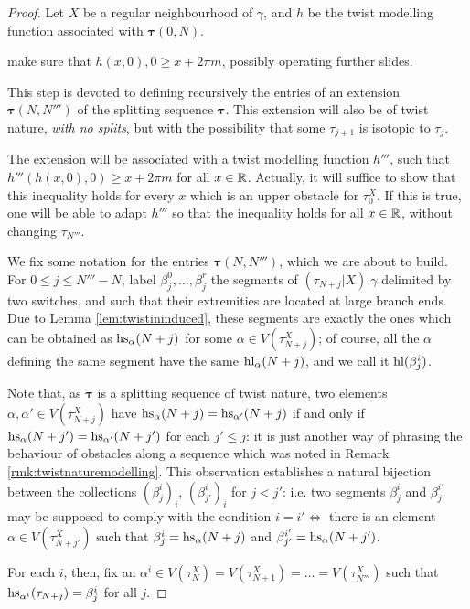 \begin{proof}
Let $X$ be a regular neighbourhood of $\gamma$, and $h$ be the twist modelling function associated with $\bm\tau(0,N)$.

 make sure that $h(x,0),0\geq x+2\pi m$, possibly operating further slides.

This step is devoted to defining recursively the entries of an extension $\bm\tau(N,N''')$ of the splitting sequence $\bm\tau$. This extension will also be of twist nature, \emph{with no splits}, but with the possibility that some $\tau_{j+1}$ is isotopic to $\tau_j$.

The extension will be associated with a twist modelling function $h'''$, such that $h'''(h(x,0),0)\geq x+2\pi m$ for all $x\in\mathbb R$. Actually, it will suffice to show that this inequality holds for every $x$ which is an upper obstacle for $\tau_0^X$. If this is true, one will be able to adapt $h'''$ so that the inequality holds for all $x\in\mathbb R$, without changing $\tau_{N'''}$.

We fix some notation for the entries $\bm\tau(N,N''')$, which we are about to build. For $0\leq j \leq N'''-N$, label $\beta_j^0,\ldots,\beta_j^r$ the segments of $(\tau_{N+j}|X).\gamma$ delimited by two switches, and such that their extremities are located at large branch ends. Due to Lemma \ref{lem:twistininduced}, these segments are exactly the ones which can be obtained as $\mathrm{hs}_\alpha(N+j)$ for some $\alpha\in V(\tau_{N+j}^X)$; of course, all the $\alpha$ defining the same segment have the same $\mathrm{hl}_\alpha(N+j)$, and we call it $\mathrm{hl}(\beta_j^i)$.

Note that, as $\bm\tau$ is a splitting sequence of twist nature, two elements $\alpha,\alpha'\in V(\tau_{N+j}^X)$ have $\mathrm{hs}_\alpha(N+j)=\mathrm{hs}_{\alpha'}(N+j)$ if and only if $\mathrm{hs}_\alpha(N+j')=\mathrm{hs}_{\alpha'}(N+j')$ for each $j'\leq j$: it is just another way of phrasing the behaviour of obstacles along a sequence which was noted in Remark \ref{rmk:twistnaturemodelling}. This observation establishes a natural bijection between the collections $(\beta_j^i)_i$, $(\beta_{j'}^i)_i$ for $j< j'$: i.e. two segments $\beta_j^i$ and $\beta_{j'}^{i'}$ may be supposed to comply with the condition $i=i' \Longleftrightarrow$ there is an element $\alpha\in V(\tau_{N+j'}^X)$ such that $\beta_j^i=\mathrm{hs}_\alpha(N+j)$ and $\beta_{j'}^{i'}=\mathrm{hs}_\alpha(N+j')$.

For each $i$, then, fix an $\alpha^i\in V(\tau_N^X)=V(\tau_{N+1}^X)=\ldots=V(\tau_{N'''}^X)$ such that $\mathrm{hs}_{\alpha^i}(\tau_{N+j})=\beta_j^i$ for all $j$.


\end{proof}
